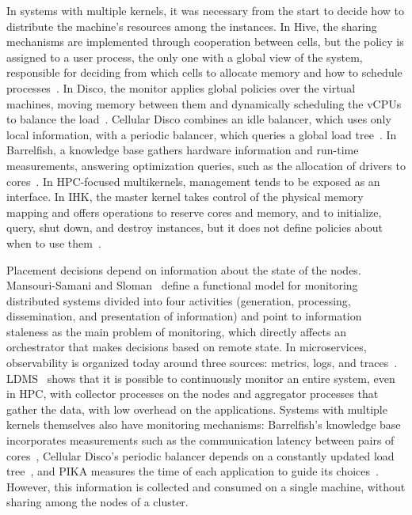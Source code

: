 \documentclass[12pt]{article}
\begin{document}
In systems with multiple kernels, it was necessary from the start to decide how to distribute the machine's resources
among the instances.
In Hive, the sharing mechanisms are implemented through cooperation between cells,
but the policy is assigned to a user process, the only one with a global view of the system, responsible for deciding
from which cells to allocate memory and how to schedule processes~\cite{chapin1995hive}.
In Disco, the monitor applies
global policies over the virtual machines, moving memory between them and dynamically scheduling the vCPUs
to balance the load~\cite{bugnion1997disco}.
Cellular Disco combines an idle balancer, which uses only
local information, with a periodic balancer, which queries a global load tree~\cite{govil2000cellular}.
In Barrelfish, a knowledge base gathers hardware information and run-time measurements, answering
optimization queries, such as the allocation of drivers to cores~\cite{baumann2009multikernel,schupbach2008diversity}.
In HPC-focused multikernels, management tends to be exposed as an interface.
In IHK, the master kernel takes
control of the physical memory mapping and offers operations to reserve cores and memory, and to initialize,
query, shut down, and destroy instances, but it does not define policies about when to use them~\cite{shimosawa2014ihk}.

Placement decisions depend on information about the state of the nodes.
Mansouri-Samani and
Sloman~\cite{mansourisamani1993monitoring} define a functional model for monitoring distributed systems
divided into four activities (generation, processing, dissemination, and presentation of information) and point to
information staleness as the main problem of monitoring, which directly affects an orchestrator that
makes decisions based on remote state.
In microservices, observability is organized today around three sources:
metrics, logs, and traces~\cite{faseeha2025observability}.
LDMS~\cite{agelastos2014ldms} shows that it is
possible to continuously monitor an entire system, even in HPC, with collector processes on the nodes and
aggregator processes that gather the data, with low overhead on the applications.
Systems with multiple kernels themselves
also have monitoring mechanisms: Barrelfish's knowledge base incorporates measurements such as the
communication latency between pairs of cores~\cite{baumann2009multikernel}, Cellular Disco's periodic balancer depends
on a constantly updated load tree~\cite{govil2000cellular}, and PIKA measures the time of each application
to guide its choices~\cite{beckmann2014pika}.
However, this information is collected and consumed on a single machine,
without sharing among the nodes of a cluster.
\end{document}
